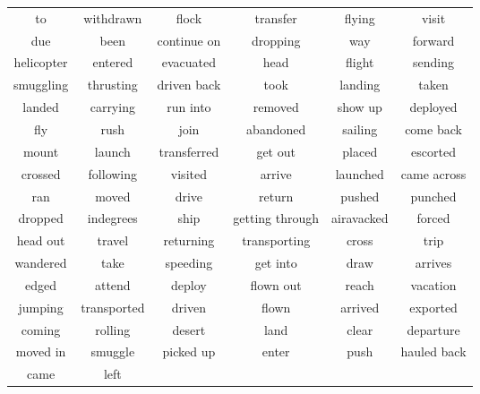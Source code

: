 \documentclass[11pt, oneside]{article}   	%
\begin{document}
\begin{itemize}
\begin{itemize}
\begin{tabular}{ c c c c c c }
to & withdrawn & flock & transfer & flying & visit\\due & been & continue on & dropping & way & forward\\helicopter & entered & evacuated & head & flight & sending\\smuggling & thrusting & driven back & took & landing & taken\\landed & carrying & run into & removed & show up & deployed\\fly & rush & join & abandoned & sailing & come back\\mount & launch & transferred & get out & placed & escorted\\crossed & following & visited & arrive & launched & came across\\ran & moved & drive & return & pushed & punched\\dropped & indegrees & ship & getting through & airavacked & forced\\head out & travel & returning & transporting & cross & trip\\wandered & take & speeding & get into & draw & arrives\\edged & attend & deploy & flown out & reach & vacation\\jumping & transported & driven & flown & arrived & exported\\coming & rolling & desert & land & clear & departure\\moved in & smuggle & picked up & enter & push & hauled back\\came & left
		\end{tabular}
	\end{itemize}


\end{itemize}
\end{document}
